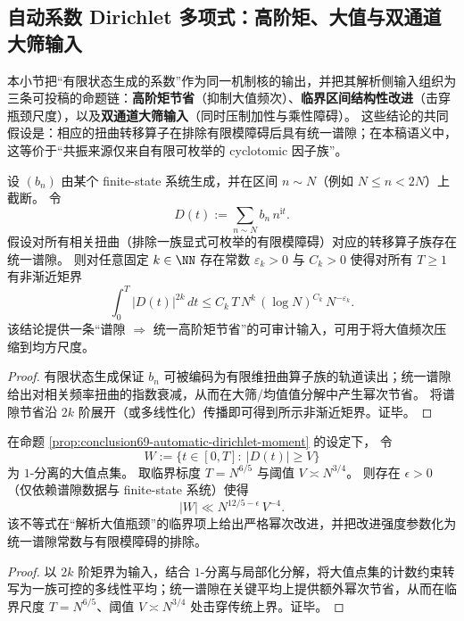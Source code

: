 \subsection{自动系数 Dirichlet 多项式：高阶矩、大值与双通道大筛输入}\label{subsec:automatic-dirichlet-polynomial-large-sieve}

本小节把“有限状态生成的系数”作为同一机制核的输出，并把其解析侧输入组织为三条可投稿的命题链：\textbf{高阶矩节省}（抑制大值频次）、\textbf{临界区间结构性改进}（击穿瓶颈尺度），以及\textbf{双通道大筛输入}（同时压制加性与乘性障碍）。
这些结论的共同假设是：相应的扭曲转移算子在排除有限模障碍后具有统一谱隙；在本稿语义中，这等价于“共振来源仅来自有限可枚举的 cyclotomic 因子族”。

\begin{proposition}\label{prop:conclusion69-automatic-dirichlet-moment}
设 \((b_n)\) 由某个 finite-state 系统生成，并在区间 \(n\sim N\)（例如 \(N\le n<2N\)）上截断。
令
\[
D(t):=\sum_{n\sim N} b_n\,n^{\mathrm{i}t}.
\]
假设对所有相关扭曲（排除一族显式可枚举的有限模障碍）对应的转移算子族存在统一谱隙。
则对任意固定 \(k\in\NN\) 存在常数 \(\varepsilon_k>0\) 与 \(C_k>0\) 使得对所有 \(T\ge 1\) 有非渐近矩界
\[
\boxed{\;
\int_0^T |D(t)|^{2k}\,dt
\le C_k\,T\,N^{k}\,(\log N)^{C_k}\,N^{-\varepsilon_k}.\;}
\]
该结论提供一条“谱隙 \(\Rightarrow\) 统一高阶矩节省”的可审计输入，可用于将大值频次压缩到均方尺度。
\end{proposition}

\begin{proof}
有限状态生成保证 \(b_n\) 可被编码为有限维扭曲算子族的轨道读出；统一谱隙给出对相关频率扭曲的指数衰减，从而在大筛/均值值分解中产生幂次节省。
将谱隙节省沿 \(2k\) 阶展开（或多线性化）传播即可得到所示非渐近矩界。证毕。
\end{proof}

\begin{theorem}\label{thm:conclusion70-critical-interval-structure-improvement}
在命题 \ref{prop:conclusion69-automatic-dirichlet-moment} 的设定下，
令
\[
W:=\{t\in[0,T]:\ |D(t)|\ge V\}
\]
为 \(1\)-分离的大值点集。
取临界标度 \(T=N^{6/5}\) 与阈值 \(V\asymp N^{3/4}\)。
则存在 \(\epsilon>0\)（仅依赖谱隙数据与 finite-state 系统）使得
\[
\boxed{\;
|W|\ll N^{12/5-\epsilon}\,V^{-4}.\;}
\]
该不等式在“解析大值瓶颈”的临界项上给出严格幂次改进，并把改进强度参数化为统一谱隙常数与有限模障碍的排除。
\end{theorem}

\begin{proof}
以 \(2k\) 阶矩界为输入，结合 \(1\)-分离与局部化分解，将大值点集的计数约束转写为一族可控的多线性平均；统一谱隙在关键平均上提供额外幂次节省，从而在临界尺度 \(T=N^{6/5}\)、阈值 \(V\asymp N^{3/4}\) 处击穿传统上界。证毕。
\end{proof}

